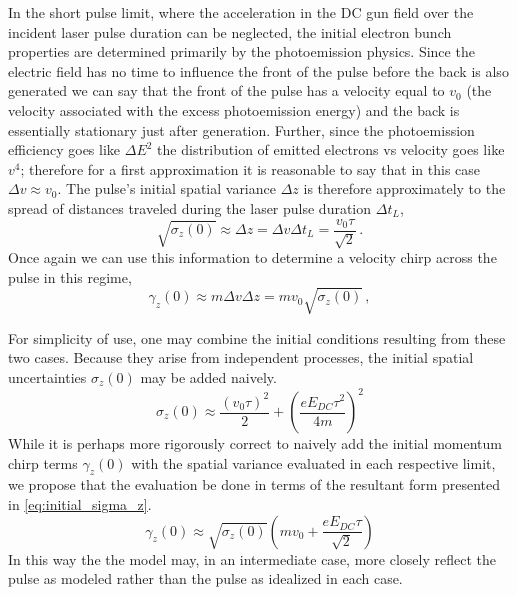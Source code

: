 In the short pulse limit, where the acceleration in the DC gun field over the incident laser pulse duration can be neglected, the initial electron bunch properties are determined primarily by the photoemission physics.
Since the electric field has no time to influence the front of the pulse before the back is also generated we can say that the front of the pulse has a velocity equal to $v_0$ (the velocity associated with the excess photoemission energy) and the back is essentially stationary just after generation.
Further, since the photoemission efficiency goes like $\Delta E^2$ \cite{shalaev_electron_1994} the distribution of emitted electrons vs velocity goes like $v^4$; therefore for a first approximation it is reasonable to say that in this case $\Delta v \approx v_0$.
The pulse's initial spatial variance $\Delta z$ is therefore approximately to the spread of distances traveled during the laser pulse duration $\Delta t_L$,
\begin{equation} 
  \sqrt{ \sigma_{ z } ( 0 ) } \approx \Delta z = \Delta v \Delta t_{L} = \frac{ v_{ 0 } \tau }{ \sqrt{ 2 } } \, \text{.}
\end{equation}
Once again we can use this information to determine a velocity chirp across the pulse in this regime,
\begin{equation}
  \gamma_{ z } ( 0 ) \approx m \Delta v \Delta z = m v_{ 0 } \sqrt{ \sigma_{ z } ( 0 ) } \, ,
\end{equation}

For simplicity of use, one may combine the initial conditions resulting from these two cases.
Because they arise from independent processes, the initial spatial uncertainties $\sigma_{ z } ( 0 )$ may be added naively.
\begin{equation} \label{eq:initial_sigma_z}
  \sigma_{ z } ( 0 ) \approx \frac{ ( v_{ 0 } \tau )^{ 2 } }{ 2 } + \left ( \frac{ e E_{ DC } \tau^{ 2 } }{ 4 m } \right )^{ 2 }
\end{equation}
While it is perhaps more rigorously correct to naively add the initial momentum chirp terms $\gamma_{ z } ( 0 )$ with the spatial variance evaluated in each respective limit, we propose that the evaluation be done in terms of the resultant form presented in \ref{eq:initial_sigma_z}.
\begin{equation}
  \gamma_{ z } ( 0 ) \approx \sqrt{ \sigma_{ z } ( 0 ) } \left ( m v_{ 0 } + \frac{ e E_{DC} \tau }{ \sqrt{ 2 } } \right )
\end{equation}
In this way the the model may, in an intermediate case, more closely reflect the pulse as modeled rather than the pulse as idealized in each case.

